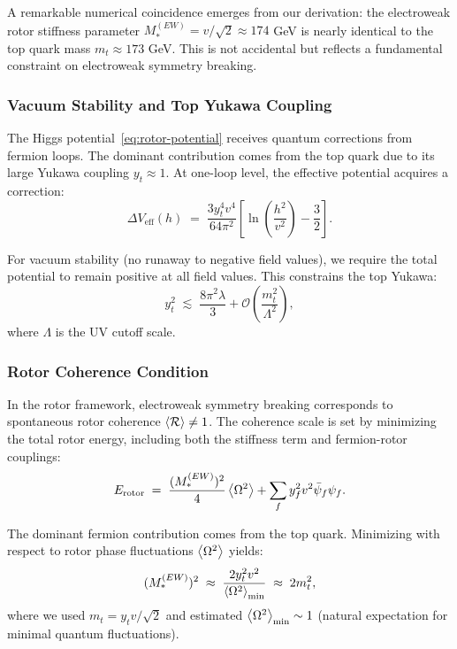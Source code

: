 \documentclass[11pt,a4paper]{article}
\newcommand{\Rotor}{\mathcal{R}}
\theoremstyle{definition}
\theoremstyle{plain}
\theoremstyle{remark}
\begin{document}
A remarkable numerical coincidence emerges from our derivation: the electroweak rotor stiffness parameter $M_*^{(EW)} = v/\sqrt{2} \approx 174$ GeV is nearly identical to the top quark mass $m_t \approx 173$ GeV. This is not accidental but reflects a fundamental constraint on electroweak symmetry breaking.

\subsubsection{Vacuum Stability and Top Yukawa Coupling}

The Higgs potential~\eqref{eq:rotor-potential} receives quantum corrections from fermion loops. The dominant contribution comes from the top quark due to its large Yukawa coupling $y_t \approx 1$. At one-loop level, the effective potential acquires a correction:
\begin{equation}
\Delta V_{\text{eff}}(h) \;=\; \frac{3y_t^4 v^4}{64\pi^2}\left[\ln\left(\frac{h^2}{v^2}\right) - \frac{3}{2}\right].
\end{equation}

For vacuum stability (no runaway to negative field values), we require the total potential to remain positive at all field values. This constrains the top Yukawa:
\begin{equation}
y_t^2 \;\lesssim\; \frac{8\pi^2\lambda}{3} + \mathcal{O}\left(\frac{m_t^2}{\Lambda^2}\right),
\end{equation}
where $\Lambda$ is the UV cutoff scale.

\subsubsection{Rotor Coherence Condition}

In the rotor framework, electroweak symmetry breaking corresponds to spontaneous rotor coherence $\ev{\Rotor} \neq 1$. The coherence scale is set by minimizing the total rotor energy, including both the stiffness term and fermion-rotor couplings:
\begin{equation}
E_{\text{rotor}} \;=\; \frac{(M_*^{(EW)})^2}{4}\ev{\Omega^2} + \sum_f y_f^2 v^2 \bar{\psi}_f\psi_f.
\end{equation}

The dominant fermion contribution comes from the top quark. Minimizing with respect to rotor phase fluctuations $\ev{\Omega^2}$ yields:
\begin{equation}
(M_*^{(EW)})^2 \;\approx\; \frac{2y_t^2 v^2}{\ev{\Omega^2}_{\min}} \;\approx\; 2m_t^2,
\end{equation}
where we used $m_t = y_t v/\sqrt{2}$ and estimated $\ev{\Omega^2}_{\min} \sim 1$ (natural expectation for minimal quantum fluctuations).
\end{document}
